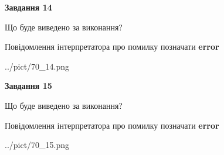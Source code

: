 \documentclass[11pt, ukrainian]{article}
\begin{document}
{\begin {large}
{\begin {center}\textbf{Завдання 14}\end {center}}\par
Що буде виведено за виконання? \par
Повідомлення інтерпретатора про помилку позначати \textbf{error}

\begin{center}
	{../pict/70_14.png}
\end{center}
\newpage

{\begin {center}\textbf{Завдання 15}\end {center}}\par
Що буде виведено за виконання? \par
Повідомлення інтерпретатора про помилку позначати \textbf{error}

\begin{center}
	{../pict/70_15.png}
\end{center}
\newpage

\end {large}}
\end{document}
